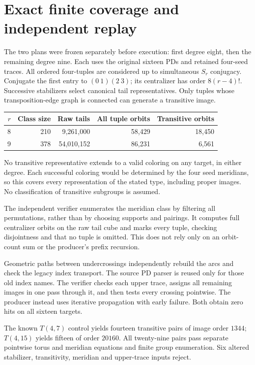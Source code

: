 \documentclass[11pt]{article}
\begin{document}
\section{Exact finite coverage and independent replay}

The two plans were frozen separately before execution: first
degree eight, then the remaining degree nine. Each uses the
original sixteen PDs and retained four-seed traces. All ordered
four-tuples are considered up to simultaneous $S_r$ conjugacy.
Conjugate the first entry to $(0\ 1)(2\ 3)$; its centralizer has
order $8(r-4)!$. Successive stabilizers select canonical tail
representatives. Only tuples whose transposition-edge graph
is connected can generate a transitive image.

\begin{center}
\begin{tabular}{rrrrr}
\toprule
$r$ & Class size & Raw tails & All tuple orbits & Transitive orbits\\
\midrule
8 & 210 & 9,261,000 & 58,429 & 18,450\\
9 & 378 & 54,010,152 & 86,231 & 6,561\\
\bottomrule
\end{tabular}
\end{center}

No transitive representative extends to a valid coloring on
any target, in either degree. Each successful coloring would
be determined by the four seed meridians, so this covers every
representation of the stated type, including proper images.
No classification of transitive subgroups is assumed.

The independent verifier enumerates the meridian class by
filtering all permutations, rather than by choosing supports
and pairings. It computes full centralizer orbits on the raw
tail cube and marks every tuple, checking disjointness and
that no tuple is omitted. This does not rely only on an
orbit-count sum or the producer's prefix recursion.

Geometric paths between undercrossings independently rebuild
the arcs and check the legacy index transport. The source PD
parser is reused only for those old index names. The verifier
checks each upper trace, assigns all remaining images in one
pass through it, and then tests every crossing pointwise.
The producer instead uses iterative propagation with early
failure. Both obtain zero hits on all sixteen targets.

The known $T(4,7)$ control yields fourteen transitive pairs of
image order $1344$; $T(4,15)$ yields fifteen of order $20160$.
All twenty-nine pairs pass separate pointwise torus and
meridian equations and finite group enumeration. Six altered
stabilizer, transitivity, meridian and upper-trace inputs reject.
\end{document}
